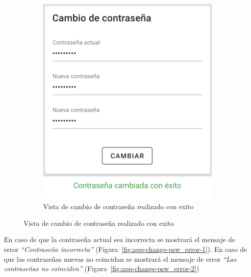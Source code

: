 \begin{itemize}
\begin{figure}[H]
\begin{subfigure}[b]{0.45\textwidth}
        \includegraphics[width=\textwidth]{images/app/change-psw-sucess.png}
        \caption{Vista de cambio de contraseña realizado con exito}
        \label{fig:app-change-psw-success}
    \end{subfigure}
    \label{fig:app-change-psw-1}
\end{figure}
En caso de que la contraseña actual sea incorrecta se mostrará el mensaje de error  \textit{“Contraseña incorrecta”} (Figura~\ref{fig:app-change-psw_error-1}).
En caso de que las contraseñas nuevas no coincidan se mostrará el mensaje de error \textit{“Las contraseñas no coinciden”} (Figura~\ref{fig:app-change-psw_error-2})
\begin{figure}[H]
    \centering
    \begin{subfigure}[b]{0.45\textwidth}
        \centering

\end{subfigure}
\end{figure}
\end{itemize}
